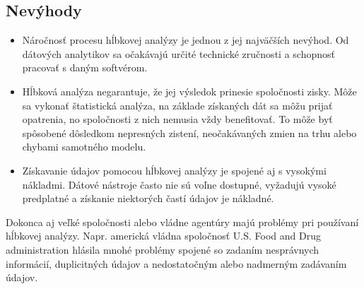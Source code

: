 \documentclass[10pt,twoside,slovak,a4paper]{article}
\begin{document}
\subsection{Nevýhody}
\begin{itemize}
\item Náročnosť procesu hĺbkovej analýzy je jednou z jej najväčších nevýhod. Od dátových analytikov sa očakávajú určité technické zručnosti a schopnosť pracovať s daným softvérom. 
\item Hĺbková analýza negarantuje, že jej výsledok prinesie spoločnosti zisky. Môže sa vykonať štatistická analýza, na základe získaných dát sa môžu prijať opatrenia, no spoločnosti z nich nemusia vždy benefitovať. To môže byť spôsobené dôsledkom nepresných zistení, neočakávaných zmien na trhu alebo chybami samotného modelu.
\item Získavanie údajov pomocou hĺbkovej analýzy je spojené aj s vysokými nákladmi. Dátové nástroje často nie sú voľne dostupné, vyžadujú vysoké predplatné a získanie niektorých častí údajov je nákladné.\cite{AlexandraTwin}\\
\end{itemize}
Dokonca aj veľké spoločnosti alebo vládne agentúry majú problémy pri používaní hĺbkovej analýzy. Napr. americká vládna spoločnosť U.S. Food and Drug administration hlásila mnohé problémy spojené so zadaním nesprávnych informácií, duplicitných údajov a nedostatočným alebo nadmerným zadávaním údajov. \cite{FDA}
\end{document}

